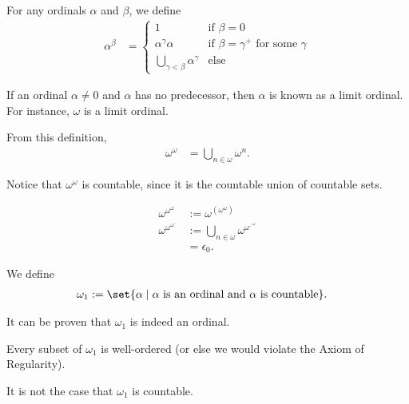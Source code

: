 \documentclass[10pt]{mypackage}
\begin{document}
\begin{definition}[Exponentiation]
  For any ordinals $\alpha$ and $\beta$, we define
  \begin{align*}
    \alpha^{\beta} &= \begin{cases}
      1 & \text{if $\beta = 0$}\\
      \alpha ^{\gamma} \alpha & \text{if $\beta = \gamma^{+}$ for some $\gamma$}\\
      \bigcup_{\gamma < \beta} \alpha^{\gamma} & \text{else}
    \end{cases}
  \end{align*}
\end{definition}
\begin{remark}
  If an ordinal $\alpha\neq 0$ and $\alpha$ has no predecessor, then $\alpha$ is known as a limit ordinal. For instance, $\omega$ is a limit ordinal.
\end{remark}
\begin{example}
  From this definition,
  \begin{align*}
    \omega^{\omega} &= \bigcup_{n \in \omega}\omega^{n}.
  \end{align*}
\end{example}
\begin{remark}
  Notice that $\omega^{\omega}$ is countable, since it is the countable union of countable sets.
\end{remark}
\begin{definition}
  \begin{align*}
    \omega^{\omega^{\omega}} &:= \omega^{\left(\omega^{\omega}\right)}\\
    \omega^{\omega^{\omega^{\iddots}}} &:= \bigcup_{n\in \omega}\omega^{\omega^{\iddots^{\omega}}}\\
                                       &= \epsilon_{0}.
  \end{align*}
\end{definition}
\begin{definition}
  We define
  \begin{align*}
    \omega_1 &:= \set{\alpha\mid \alpha\text{ is an ordinal and } \alpha\text{ is countable}}.
  \end{align*}
\end{definition}
\begin{remark}
  It can be proven that $\omega_1$ is indeed an ordinal.\newline

  Every subset of $\omega_1$ is well-ordered (or else we would violate the Axiom of Regularity).
\end{remark}
\begin{theorem}
  It is not the case that $\omega_1$ is countable.
\end{theorem}
\end{document}
